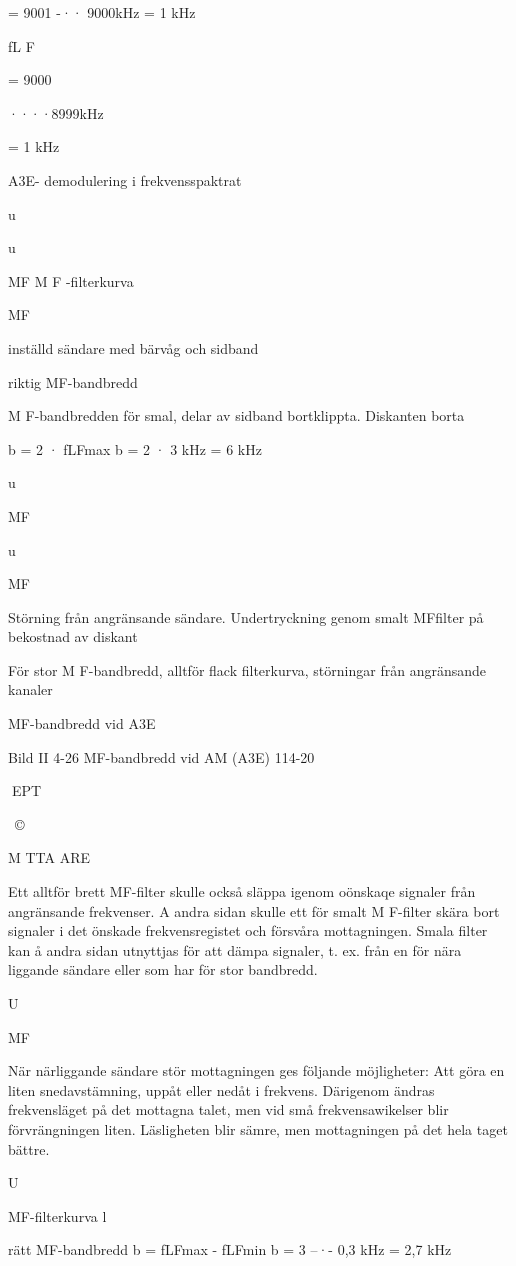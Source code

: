 = 9001 -·· 9000kHz = 1 kHz

fL F

= 9000

····8999kHz

= 1 kHz

A3E- demodulering i frekvensspaktrat

u

u

MF
M F -filterkurva

MF

inställd sändare
med bärvåg och sidband

riktig MF-bandbredd

M F-bandbredden för smal, delar av
sidband bortklippta. Diskanten borta

b = 2 · fLFmax
b = 2 · 3 kHz = 6 kHz

u

MF

u

MF

Störning från angränsande sändare.
Undertryckning genom smalt MFfilter på bekostnad av diskant

För stor M F-bandbredd, alltför
flack filterkurva, störningar från
angränsande kanaler

MF-bandbredd vid A3E

Bild II 4-26 MF-bandbredd vid AM (A3E)
114-20

EPT

~©~

M TTA ARE

Ett alltför brett MF-filter skulle också
släppa igenom oönskaqe signaler från angränsande frekvenser. A andra sidan skulle
ett för smalt M F-filter skära bort signaler i det
önskade frekvensregistet och försvåra mottagningen. Smala filter kan å andra sidan
utnyttjas för att dämpa signaler, t. ex. från en
för nära liggande sändare eller som har för
stor bandbredd.

U

MF

När närliggande sändare stör mottagningen
ges följande möjligheter:
Att göra en liten snedavstämning, uppåt
eller nedåt i frekvens. Därigenom ändras frekvensläget på det mottagna talet, men vid små frekvensawikelser blir
förvrängningen liten. Läsligheten blir
sämre, men mottagningen på det hela
taget bättre.

U

MF-filterkurva
l

rätt MF-bandbredd
b = fLFmax - fLFmin
b = 3 --·- 0,3 kHz = 2,7 kHz

